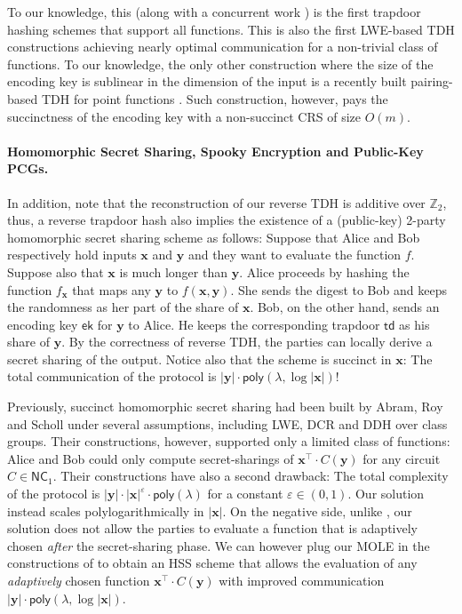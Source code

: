 \documentclass{article}
\newcommand{\ek}{\mathsf{ek}}
\newcommand{\td}{\mathsf{td}}
\newcommand{\Z}{\mathbb{Z}}
\newcommand{\poly}{\mathsf{poly}}
\renewcommand{\sec}{\ensuremath{\lambda}}
\begin{document}
To our knowledge, this (along with a concurrent work \cite{EC:BJSS25}) is the first trapdoor hashing schemes that support all functions. This is also the first LWE-based TDH constructions achieving nearly optimal communication for a non-trivial class of functions. To our knowledge, the only other construction where the size of the encoding key is sublinear in the dimension of the input is a recently built pairing-based TDH for point functions \cite{Nico}. Such construction, however, pays the succinctness of the encoding key with a non-succinct CRS of size $O(m)$.


\paragraph{Homomorphic Secret Sharing, Spooky Encryption and Public-Key PCGs.}
In addition, note that the reconstruction of our reverse TDH is additive over $\Z_2$, thus, a reverse trapdoor hash also implies the existence of a (public-key) 2-party homomorphic secret sharing \cite{C:BoyGilIsh16} scheme as follows: Suppose that Alice and Bob respectively hold inputs $\mathbf{x}$ and $\mathbf{y}$ and they want to evaluate the function $f$. Suppose also that $\mathbf{x}$ is much longer than $\mathbf{y}$. Alice proceeds by hashing the function $f_\mathbf{x}$ that maps any $\mathbf{y}$ to $f(\mathbf{x}, \mathbf{y})$. She sends the digest to Bob and keeps the randomness as her part of the share of $\mathbf{x}$. Bob, on the other hand, sends an encoding key $\ek$ for $\mathbf{y}$ to Alice. He keeps the corresponding trapdoor $\td$ as his share of $\mathbf{y}$. By the correctness of reverse TDH, the parties can locally derive a secret sharing of the output. Notice also that the scheme is succinct in $\mathbf{x}$: The total communication of the protocol is $\lvert \mathbf{y}\rvert \cdot \poly(\sec, \log \lvert \mathbf{x}\rvert)$!

Previously, succinct homomorphic secret sharing had been built by Abram, Roy and Scholl \cite{EC:AbrRoySch24} under several assumptions, including LWE, DCR and DDH over class groups. Their constructions, however, supported only a limited class of functions: Alice and Bob could only compute secret-sharings of $\mathbf{x}^\intercal\cdot C(\mathbf{y})$ for any circuit $C\in\mathsf{NC}_1$. Their constructions have also a second drawback: The total complexity of the protocol is $\lvert \mathbf{y}\rvert \cdot \lvert \mathbf{x}\rvert^\varepsilon \cdot \poly(\sec)$ for a constant $\varepsilon\in (0, 1)$. Our solution instead scales polylogarithmically in $\lvert \mathbf{x}\rvert$. On the negative side, unlike \cite{EC:AbrRoySch24}, our solution does not allow the parties to evaluate a function that is adaptively chosen \emph{after} the secret-sharing phase. We can however plug our MOLE in the constructions of \cite{EC:AbrRoySch24} to obtain an HSS scheme that allows the evaluation of any \emph{adaptively} chosen function $\mathbf{x}^\intercal\cdot C(\mathbf{y})$ with improved communication $\lvert \mathbf{y}\rvert \cdot \poly(\sec, \log \lvert \mathbf{x}\rvert)$. 
\end{document}
